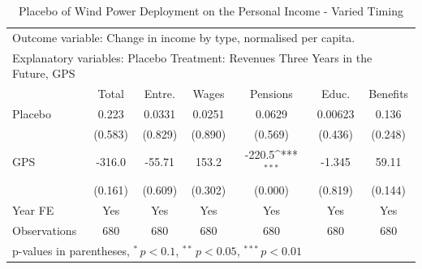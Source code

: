 \begin{table}[htbp]\centering
\def\sym#1{\ifmmode^{#1}\else\(^{#1}\)\fi}
\caption{Placebo of Wind Power Deployment on the Personal Income - Varied Timing \label{incomeplacebo}}
\begin{tabular*}{\hsize}{@{\hskip\tabcolsep\extracolsep\fill}l*{6}{c}}
\toprule
\multicolumn{7}{l}{\parbox{11cm}{Outcome variable: Change in income by type, normalised per capita. }} \\ \multicolumn{7}{l}{\parbox{11cm}{Explanatory variables: Placebo Treatment: Revenues Three Years in the Future, GPS}} \\ \midrule & Total & Entre. & Wages & Pensions & Educ. & Benefits \\ \toprule
\addlinespace Placebo&       0.223         &      0.0331         &      0.0251         &      0.0629         &     0.00623         &       0.136         \\
            &     (0.583)         &     (0.829)         &     (0.890)         &     (0.569)         &     (0.436)         &     (0.248)         \\\addlinespace
GPS         &      -316.0         &      -55.71         &       153.2         &      -220.5\sym{***}&      -1.345         &       59.11         \\
            &     (0.161)         &     (0.609)         &     (0.302)         &     (0.000)         &     (0.819)         &     (0.144)         \\\addlinespace
\midrule
\addlinespace Year FE&         Yes         &         Yes         &         Yes         &         Yes         &         Yes         &         Yes         \\
\addlinespace \midrule \addlinespace Observations&         680         &         680         &         680         &         680         &         680         &         680         \\
\bottomrule
\multicolumn{7}{l}{\footnotesize p-values in parentheses, $^{*}\, p<0.1$, $^{**}\, p<0.05$, $^{***}\, p<0.01$}\\
\end{tabular*}
\end{table}
